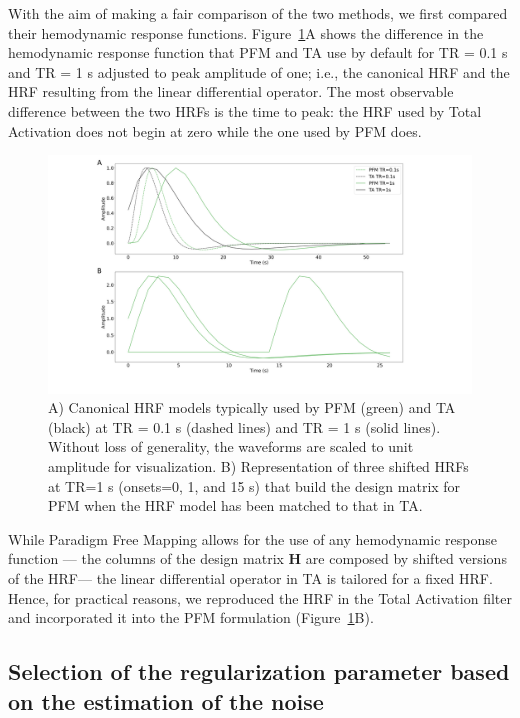 With the aim of making a fair comparison of the two methods, we first compared their hemodynamic response functions. Figure~\ref{fig:hrf_diff}A shows the difference in the hemodynamic response function that PFM and TA use by default for TR = 0.1 s and TR = 1 s adjusted to peak amplitude of one; i.e., the canonical HRF and the HRF resulting from the linear differential operator. The most observable difference between the two HRFs is the time to peak: the HRF used by Total Activation does not begin at zero while the one used by PFM does.

\begin{figure}[h]
    \includegraphics[width=\columnwidth]{figures/pfm_ta_hrf.pdf}
    \caption{A) Canonical HRF models typically used by PFM (green) and TA (black) at TR = 0.1 s (dashed lines) and TR = 1 s (solid lines). Without loss of generality, the waveforms are scaled to unit amplitude for visualization. B) Representation of three shifted HRFs at TR=1 s (onsets=0, 1, and 15 s) that build the design matrix for PFM when the HRF model has been matched to that in TA.}
\label{fig:hrf_diff}
\end{figure}

While Paradigm Free Mapping allows for the use of any hemodynamic response function --- the columns of the design matrix \(\mathbf{H}\) are composed by shifted versions of the HRF--- the linear differential operator in TA is tailored for a fixed HRF. Hence, for practical reasons, we reproduced the HRF in the Total Activation filter and incorporated it into the PFM formulation (Figure~\ref{fig:hrf_diff}B).

\subsection{Selection of the regularization parameter based on the estimation of the noise}

